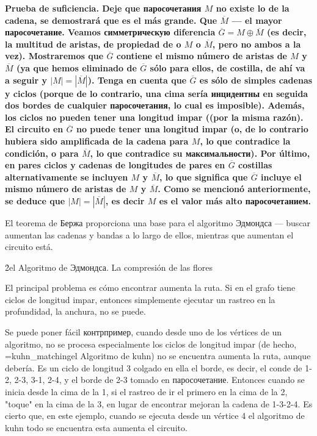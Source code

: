 \bf{Prueba de suficiencia}. Deje que паросочетания $M$ no existe lo de la cadena, se demostrará que es el más grande. Que $\overline M$ --- el mayor паросочетание. Veamos симметрическую diferencia $\overline G = M \oplus \overline M$ (es decir, la multitud de aristas, de propiedad de o $M$ o $\overline M$, pero no ambos a la vez). Mostraremos que $\overline G$ contiene el mismo número de aristas de $M$ y $\overline M$ (ya que hemos eliminado de $\overline G$ sólo para ellos, de costilla, de ahí va a seguir y $|M| = |\overline M|$). Tenga en cuenta que $\overline G$ es sólo de simples cadenas y ciclos (porque de lo contrario, una cima sería инцидентны en seguida dos bordes de cualquier паросочетания, lo cual es imposible). Además, los ciclos no pueden tener una longitud impar ((por la misma razón). El circuito en $\overline G$ no puede tener una longitud impar (o, de lo contrario hubiera sido amplificada de la cadena para $M$, lo que contradice la condición, o para $\overline M$, lo que contradice su максимальности). Por último, en pares ciclos y cadenas de longitudes de pares en $\overline G$ costillas alternativamente se incluyen $M$ y $\overline M$, lo que significa que $\overline G$ incluye el mismo número de aristas de $M$ y $\overline M$. Como se mencionó anteriormente, se deduce que $|M| = |\overline M|$, es decir $M$ es el valor más alto паросочетанием.

El teorema de Бержа proporciona una base para el algoritmo Эдмондса --- buscar aumentan las cadenas y bandas a lo largo de ellos, mientras que aumentan el circuito está.


\h2{el Algoritmo de Эдмондса. La compresión de las flores}

El principal problema es cómo encontrar aumenta la ruta. Si en el grafo tiene ciclos de longitud impar, entonces simplemente ejecutar un rastreo en la profundidad, la anchura, no se puede.

Se puede poner fácil контрпример, cuando desde uno de los vértices de un algoritmo, no se procesa especialmente los ciclos de longitud impar (de hecho, \algohref=kuhn_matching{el Algoritmo de kuhn}) no se encuentra aumenta la ruta, aunque debería. Es un ciclo de longitud 3 colgado en ella el borde, es decir, el conde de 1-2, 2-3, 3-1, 2-4, y el borde de 2-3 tomado en паросочетание. Entonces cuando se inicia desde la cima de la 1, si el rastreo de ir el primero en la cima de la 2, "toque" en la cima de la 3, en lugar de encontrar mejoran la cadena de 1-3-2-4. Es cierto que, en este ejemplo, cuando se ejecuta desde un vértice 4 el algoritmo de kuhn todo se encuentra esta aumenta el circuito.

